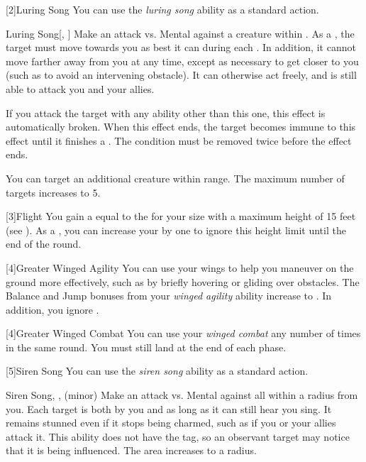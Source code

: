         [2]{Luring Song} You can use the \textit{luring song} ability as a standard action.
        \begin{magicalactiveability}{Luring Song}[, ]
                \rankline
                Make an attack vs. Mental against a creature within \longrange.
                \hit As a , the target must move towards you as best it can during each .
                In addition, it cannot move farther away from you at any time, except as necessary to get closer to you (such as to avoid an intervening obstacle).
                It can otherwise act freely, and is still able to attack you and your allies.

                If you attack the target with any ability other than this one, this effect is automatically broken.
                When this effect ends, the target becomes immune to this effect until it finishes a .
                \crit The condition must be removed twice before the effect ends.

                \rankline
                 You can target an additional creature within range.
                 The maximum number of targets increases to 5.
            \end{magicalactiveability}

        [3]{Flight} You gain a  equal to the  for your size with a maximum height of 15 feet (see ).
        As a , you can increase your  by one to ignore this height limit until the end of the round.

        [4]{Greater Winged Agility} You can use your wings to help you maneuver on the ground more effectively, such as by briefly hovering or gliding over obstacles.
        The Balance and Jump bonuses from your \textit{winged agility} ability increase to .
        In addition, you ignore .

        [4]{Greater Winged Combat} You can use your \textit{winged combat} any number of times in the same round.
        You must still land at the end of each phase.

        [5]{Siren Song} You can use the \textit{siren song} ability as a standard action.
        \begin{magicalsustainability}{Siren Song}{, ,  (minor)}
            \rankline
            Make an attack vs. Mental against all  within a \medarea radius from you.
            \hit Each target is both \charmed by you and \stunned as long as it can still hear you sing.
            It remains stunned even if it stops being charmed, such as if you or your allies attack it.
            This ability does not have the  tag, so an observant target may notice that it is being influenced.
            \rankline
             The area increases to a \largearea radius.
        \end{magicalsustainability}

